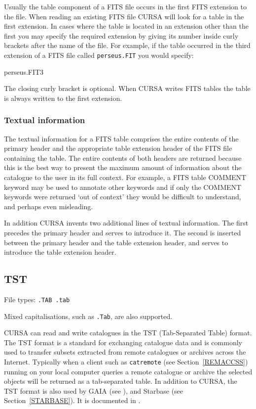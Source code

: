 \documentclass[twoside,11pt]{starlink}
\begin{document}
Usually the table component of a FITS file occurs in the first FITS
extension to the file. When reading an existing FITS file CURSA will look
for a table in the first extension. In cases where the table is located
in an extension other than the first you may specify the required
extension by giving its number inside curly brackets after the name
of the file. For example, if the table occurred in the third extension
of a FITS file called \texttt{perseus.FIT} you would specify:

\begin{terminalv}
perseus.FIT{3}
\end{terminalv}

The closing curly bracket is optional. When CURSA writes FITS tables
the table is always written to the first extension.

\subsubsection{Textual information}

The textual information for a FITS table comprises the entire contents
of the primary header and the appropriate table extension header of the
FITS file containing the table. The entire contents of both headers are
returned because this is the best way to present the maximum amount of
information about the catalogue to the user in its full context. For
example, a FITS table COMMENT keyword may be used to annotate other
keywords and if only the COMMENT keywords were returned `out of context'
they would be difficult to understand, and perhaps even misleading.

In addition CURSA invents two additional lines of textual information.
The first precedes the primary header and serves to introduce it. The
second is inserted between the primary header and the table extension
header, and serves to introduce the table extension header.

\subsection{\label{TST}TST}

File types: \texttt{.TAB  .tab}

Mixed capitalisations, such as \texttt{.Tab}, are also supported.

CURSA can read and write catalogues in the TST (Tab-Separated Table)
format.  The TST format is a standard for exchanging catalogue data
and is commonly used to transfer subsets extracted from remote catalogues
or archives across the Internet.  Typically when a client such as \texttt{catremote} (see Section~\ref{REMACCSS}) running on your local computer
queries a remote catalogue or archive the selected objects will be returned
as a tab-separated table.  In addition to CURSA, the TST format is
also used by GAIA (see \cite{SUN214}),
and Starbase (see Section~\ref{STARBASE}).  It is documented in
\cite{SSN75}.
\end{document}
